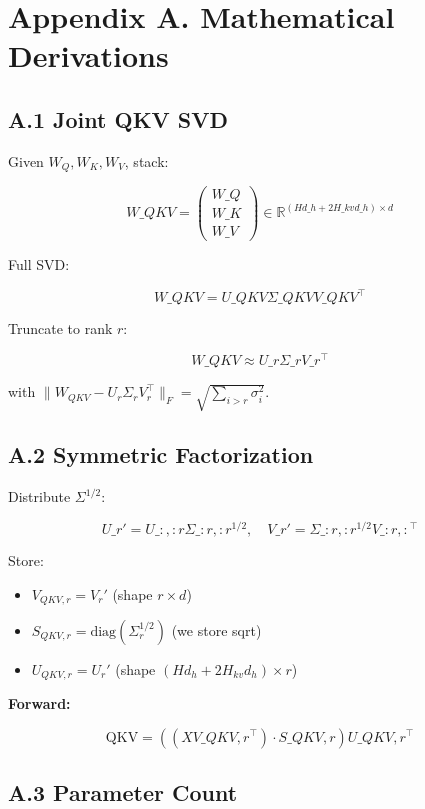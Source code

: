 \section{Appendix A. Mathematical Derivations}

\subsection{A.1 Joint QKV SVD}

Given $W_Q, W_K, W_V$, stack:

\[
W\_{QKV} = \begin{pmatrix} W\_Q \\ W\_K \\ W\_V \end{pmatrix} \in \mathbb{R}^{(H d\_h + 2 H\_{kv} d\_h) \times d}
\]

Full SVD:

\[
W\_{QKV} = U\_{QKV} \Sigma\_{QKV} V\_{QKV}^\top
\]

Truncate to rank $r$:

\[
W\_{QKV} \approx U\_r \Sigma\_r V\_r^\top
\]

with $\|W_{QKV} - U_r \Sigma_r V_r^\top\|_F = \sqrt{\sum_{i > r} \sigma_i^2}$.

\subsection{A.2 Symmetric Factorization}

Distribute $\Sigma^{1/2}$:

\[
U\_r' = U\_{:, :r} \Sigma\_{:r, :r}^{1/2}, \quad
V\_r' = \Sigma\_{:r, :r}^{1/2} V\_{:r, :}^\top
\]

Store:
\begin{itemize}
\item $V_{QKV, r} = V_r'$ (shape $r \times d$)
\item $S_{QKV, r} = \text{diag}(\Sigma_r^{1/2})$ (we store sqrt)
\item $U_{QKV, r} = U_r'$ (shape $(H d_h + 2 H_{kv} d_h) \times r$)

\end{itemize}
\textbf{Forward:}

\[
\text{QKV} = \left((X V\_{QKV, r}^\top) \cdot S\_{QKV, r}\right) U\_{QKV, r}^\top
\]

\subsection{A.3 Parameter Count}


